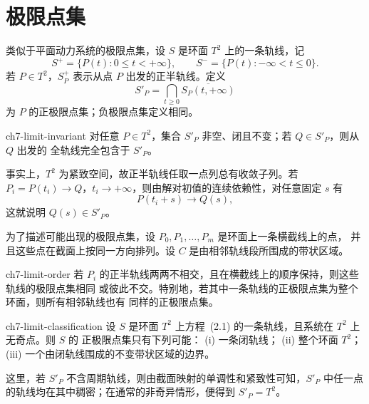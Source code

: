 \section{极限点集}

类似于平面动力系统的极限点集，设 $S$ 是环面 $T^2$ 上的一条轨线，记
\[
  S^+=\{P(t):0\leq t<+\infty\},\qquad
  S^-=\{P(t):-\infty<t\leq0\}.
\]
若 $P\in T^2$，$S_P^+$ 表示从点 $P$ 出发的正半轨线。定义
\[
  S'_P=\bigcap_{t\geq0}\overline{S_P(t,+\infty)}
\]
为 $P$ 的正极限点集；负极限点集定义相同。

\begin{lemma}{}{ch7-limit-invariant}
对任意 $P\in T^2$，集合 $S'_P$ 非空、闭且不变；若 $Q\in S'_P$，则从 $Q$ 出发的
全轨线完全包含于 $S'_P$。
\end{lemma}

事实上，$T^2$ 为紧致空间，故正半轨线任取一点列总有收敛子列。若
$P_i=P(t_i)\to Q$，$t_i\to+\infty$，则由解对初值的连续依赖性，对任意固定 $s$ 有
\[
  P(t_i+s)\longrightarrow Q(s),
\]
这就说明 $Q(s)\in S'_P$。

为了描述可能出现的极限点集，设 $P_0,P_1,\ldots,P_m$ 是环面上一条横截线上的点，
并且这些点在截面上按同一方向排列。设 $C$ 是由相邻轨线段所围成的带状区域。

\begin{lemma}{}{ch7-limit-order}
若 $P_i$ 的正半轨线两两不相交，且在横截线上的顺序保持，则这些轨线的极限点集相同
或彼此不交。特别地，若其中一条轨线的正极限点集为整个环面，则所有相邻轨线也有
同样的正极限点集。
\end{lemma}

\begin{theorem}{}{ch7-limit-classification}
设 $S$ 是环面 $T^2$ 上方程~(2.1) 的一条轨线，且系统在 $T^2$ 上无奇点。则 $S$ 的
正极限点集只有下列可能：\newline
\noindent (i) 一条闭轨线；\newline
\noindent (ii) 整个环面 $T^2$；\newline
\noindent (iii) 一个由闭轨线围成的不变带状区域的边界。
\end{theorem}

这里，若 $S'_P$ 不含周期轨线，则由截面映射的单调性和紧致性可知，$S'_P$ 中任一点
的轨线均在其中稠密；在通常的非奇异情形，便得到 $S'_P=T^2$。

